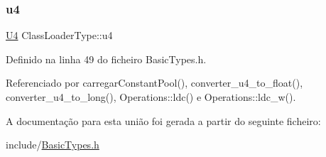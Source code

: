 \mbox{\label{unionClassLoaderType_aad01cfe6aac48729f55425b67a70622e}} 
\subsubsection{\texorpdfstring{u4}{u4}}
{\footnotesize\ttfamily \hyperlink{BasicTypes_8h_ac6d2ba2e53dd424684ead2f40e74a8b6}{U4} Class\+Loader\+Type\+::u4}



Definido na linha 49 do ficheiro Basic\+Types.\+h.



Referenciado por carregar\+Constant\+Pool(), converter\+\_\+u4\+\_\+to\+\_\+float(), converter\+\_\+u4\+\_\+to\+\_\+long(), Operations\+::ldc() e Operations\+::ldc\+\_\+w().



A documentação para esta união foi gerada a partir do seguinte ficheiro\+:\begin{DoxyCompactItemize}
\item 
include/\hyperlink{BasicTypes_8h}{Basic\+Types.\+h}\end{DoxyCompactItemize}
